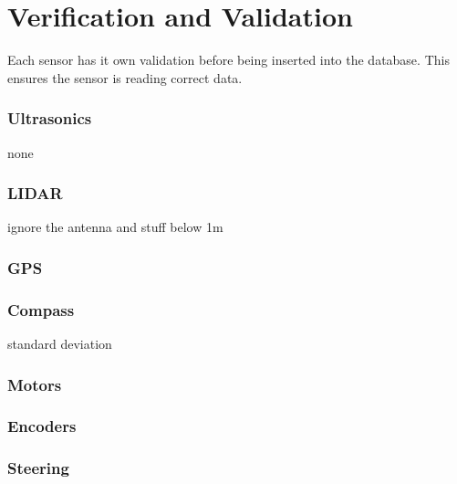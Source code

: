 \section{Verification and Validation}

Each sensor has it own validation before being inserted into the database. This ensures the sensor is reading correct data.

\subsubsection{Ultrasonics}
none


\subsubsection{LIDAR}
ignore the antenna and stuff below 1m

\subsubsection{GPS}


\subsubsection{Compass}
standard deviation

\subsubsection{Motors}

\subsubsection{Encoders}

\subsubsection{Steering}

